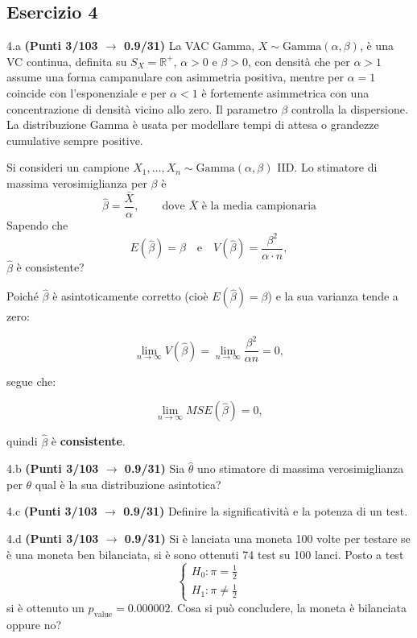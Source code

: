 \documentclass[
  11pt,
]{book}
\theoremstyle{mytheoremstyle}
\theoremstyle{mydefstyle}
\newenvironment{sol}
  {
  \begin{tcolorbox}[enhanced,breakable,arc=0.1mm,boxrule=1pt,colback=white,colframe=iblue,
  title=\bf \fontfamily{lmss}\selectfont \hspace{.5 cm} Soluzione,drop fuzzy shadow]

}{
\end{tcolorbox}
  }
\begin{document}
\subsection{Esercizio 4}\label{esercizio-4-42}

4.a \textbf{(Punti 3/103 \(\rightarrow\) 0.9/31)} La VAC Gamma, \(X \sim \text{Gamma}(\alpha, \beta)\), è una VC continua, definita su \(S_X=\mathbb{R}^+\), \(\alpha>0\) e \(\beta>0\), con densità che per \(\alpha > 1\) assume una forma campanulare con asimmetria positiva, mentre per \(\alpha = 1\) coincide con l'esponenziale e per \(\alpha < 1\) è fortemente asimmetrica con una concentrazione di densità vicino allo zero. Il parametro \(\beta\) controlla la dispersione. La distribuzione Gamma è usata per modellare tempi di attesa o grandezze cumulative sempre positive.

Si consideri un campione \(X_1,\dots,X_n \sim \text{Gamma}(\alpha,\beta)\) IID. Lo stimatore di massima verosimiglianza per \(\beta\) è
\[
\hat\beta = \frac {\bar X}\alpha,\qquad \text{dove $\bar X$ è la media campionaria}
\]
Sapendo che
\[
E(\hat\beta) = \beta~~~ \text{ e }~~~ V(\hat\beta) = \frac{\beta^2}{\alpha \cdot n},
\]
\(\hat\beta\) è consistente?

\begin{sol}
Poiché \(\hat\beta\) è asintoticamente corretto (cioè \(E(\hat\beta) = \beta\))
e la sua varianza tende a zero:

\[
\lim_{n \to \infty} V(\hat\beta) = \lim_{n \to \infty} \frac{\beta^2}{\alpha n} = 0,
\]

segue che:

\[
\lim_{n \to \infty} MSE(\hat\beta) = 0,
\]

quindi \(\hat\beta\) è \textbf{consistente}.

\end{sol}

4.b \textbf{(Punti 3/103 \(\rightarrow\) 0.9/31)} Sia \(\hat\theta\) uno stimatore di massima verosimiglianza per \(\theta\) qual è la sua distribuzione asintotica?

4.c \textbf{(Punti 3/103 \(\rightarrow\) 0.9/31)} Definire la significatività e la potenza di un test.

4.d \textbf{(Punti 3/103 \(\rightarrow\) 0.9/31)} Si è lanciata una moneta 100 volte per testare se è una moneta ben bilanciata,
si è sono ottenuti 74 test su 100 lanci. Posto a test
\[
\begin{cases}
H_0: \pi = \frac 12\\
H_1: \pi\ne\frac 12
\end{cases}
\]
si è ottenuto un \(p_\text{value}=0.000002\). Cosa si può concludere, la moneta è bilanciata oppure no?
\end{document}
